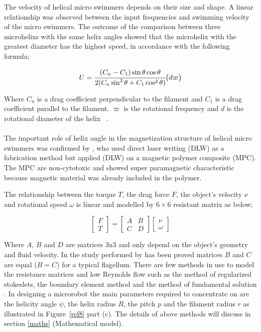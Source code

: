 \documentclass[12pt,a4paper,titlepage]{report}
\begin{document}
The velocity of helical micro swimmers depends on their size and shape. A linear relationship was 
observed between the input frequencies and swimming velocity of the micro swimmers. The outcome of 
the comparison between three microhelixs with the same helix angles showed that the microhelix with the
 greatest diameter has the highest speed, in accordance with the following formula;

\begin{equation}
  U = {\cfrac{(C_n - C_1) \sin \theta \cos \theta}{2(C_n \sin^2 \theta + C_1 \cos^2 \theta)}} \big( d \varpi \big)
\end{equation} 

Where $C_n$ is a drag coefficient perpendicular to the filament and $C_1$ is a drag coefficient
 parallel to the filament. $ \varpi$ is the rotational frequency and $d$ is the rotational diameter of 
the helix ~\citep{tottori2012magnetic}.  



\paragraph{}
The important role of helix angle in the magnetization structure of helical micro swimmers 
was confirmed by \citeauthor{peyer2013bacteria} \citep{peyer2013bacteria}, who used direct laser writing (DLW) as a fabrication method but 
applied (DLW) on a magnetic polymer composite (MPC). The MPC are non-cytotoxic and showed 
super paramagnetic characteristic because magnetic material was already included in the polymer. 

The relationship between the torque $T$, the drag force $F$, the object\rq{}s velocity $\nu$ and rotational 
speed $\omega$ is linear and modelled by $6\times6$ resistant matrix as below;



\[
\begin{bmatrix} F\\ 
T \end{bmatrix}  =\begin{bmatrix} A & B \\ 
C & D \end{bmatrix}  \begin{bmatrix} \nu
 \\ \omega
\end{bmatrix}
\]




Where $A$, $B$ and $D$ are matrices 3x3 and only depend on the object\rq{}s geometry and fluid velocity.
In the study performed by \citeauthor{purcell1997efficiency} \citep{purcell1997efficiency} has been proved 
matrices $B$ and $C$ are equal ($B = C$) for a typical flagellum. 
There are few methods in use to model the resistance matrices and low Reynolds flow such as the 
method of regularized stokeslets, the boundary element method and the method of fundamental solution
. In designing a microrobot the main parameters required to concentrate on are the helicity angle $\psi$, 
the helix radius $R$, the pitch $p$ and the filament radius $r$ as illustrated in Figure~\ref{ref8} part (c). 
The details of above methods will discuss in section \ref{maths} (Mathematical model).
\end{document}
